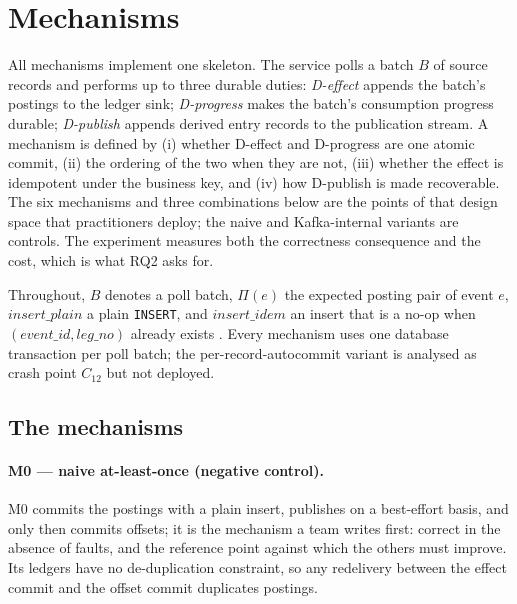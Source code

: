 
\section{Mechanisms}
\label{sec:mechanisms}

All mechanisms implement one skeleton. The service polls a batch $B$ of source records and
performs up to three durable duties: \emph{D-effect} appends the batch's postings to the
ledger sink; \emph{D-progress} makes the batch's consumption progress durable;
\emph{D-publish} appends derived entry records to the publication stream. A mechanism is
defined by (i) whether D-effect and D-progress are one atomic commit, (ii) the ordering of
the two when they are not, (iii) whether the effect is idempotent under the business key, and
(iv) how D-publish is made recoverable. The six mechanisms and three combinations below are
the points of that design space that practitioners deploy; the naive and Kafka-internal
variants are controls. The experiment measures both the correctness consequence and the cost,
which is what RQ2 asks for.

Throughout, $B$ denotes a poll batch, $\Pi(e)$ the expected posting pair of event $e$,
$\mathit{insert\_plain}$ a plain \texttt{INSERT}, and $\mathit{insert\_idem}$ an insert that is
a no-op when $(\mathit{event\_id},\mathit{leg\_no})$ already exists
\cite{pg-onconflict}. Every mechanism uses one database transaction per poll batch; the
per-record-autocommit variant is analysed as crash point $C_{12}$ but not deployed.

\subsection{The mechanisms}
\label{sec:mechanisms:defs}

\paragraph{M0 --- naive at-least-once (negative control).}
M0 commits the postings with a plain insert, publishes on a best-effort basis, and only then
commits offsets; it is the mechanism a team writes first: correct in the absence of faults,
and the reference point against which the others must improve. Its ledgers have no
de-duplication constraint, so any redelivery between the effect commit and the offset commit
duplicates postings.

